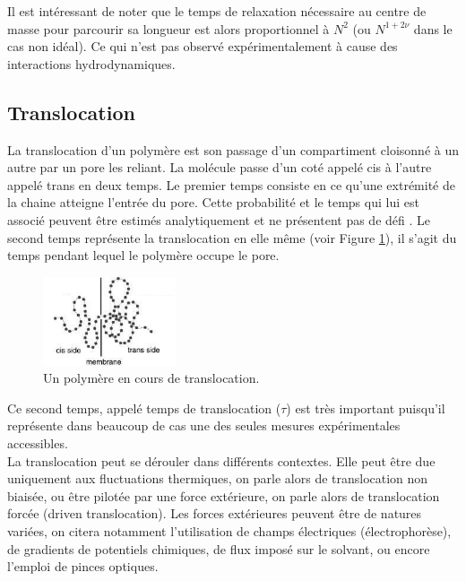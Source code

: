 \documentclass[a4paper,11pt]{article}
\begin{document}
Il est intéressant de noter que le temps de relaxation nécessaire au centre de masse pour parcourir sa longueur est alors proportionnel à $N^2$ (ou $N^{1+2\nu}$ dans le cas non idéal). Ce qui n'est pas observé expérimentalement à cause des interactions hydrodynamiques.



\subsection{Translocation}

La translocation d'un polymère est son passage d'un compartiment cloisonné à un autre par un pore les reliant. La molécule passe d'un coté appelé cis à l'autre appelé trans en deux temps. Le premier temps consiste en ce qu'une extrémité de la chaine atteigne l'entrée du pore. Cette probabilité et le temps qui lui est associé peuvent être estimés analytiquement et ne présentent pas de défi \cite{milchev}. Le second temps représente la translocation en elle même (voir Figure \ref{transloc}), il s'agit du temps pendant lequel le polymère occupe le pore.\\

\begin{figure}[H]
\begin{center}
\includegraphics[width=0.35\textwidth]{transloc.jpg}

\caption{Un polymère en cours de translocation.}
\label{transloc}
\end{center}
\end{figure}



Ce second temps, appelé temps de translocation ($\tau$) est très important puisqu'il représente dans beaucoup de cas une des seules mesures expérimentales accessibles.\\

La translocation peut se dérouler dans différents contextes. Elle peut être due uniquement aux fluctuations thermiques, on parle alors de translocation non biaisée, ou être pilotée par une force extérieure, on parle alors de translocation forcée (driven translocation). Les forces extérieures peuvent être de natures variées, on citera notamment l'utilisation de champs électriques (électrophorèse), de gradients de potentiels chimiques, de flux imposé sur le solvant, ou encore l'emploi de pinces optiques.\\
\end{document}
